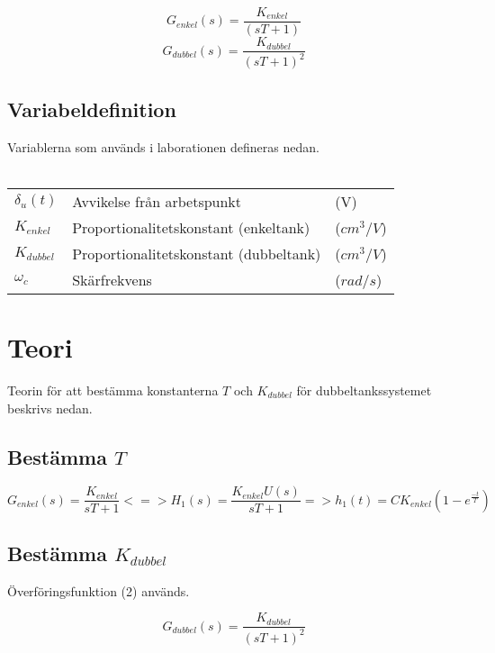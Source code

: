 \documentclass[a4paper]{article}
\begin{document}
\begin{equation}
  G_{enkel}(s)=\frac{K_{enkel}}{(sT+1)}
\end{equation}
\begin{equation}
  G_{dubbel}(s)=\frac{K_{dubbel}}{(sT+1)^2}
\end{equation}

\subsection{Variabeldefinition}

Variablerna som används i laborationen defineras nedan.
\\\\
\begin{tabular}{l l l}
  $\delta_{u}(t)$ & Avvikelse från arbetspunkt & (V) \\
  $K_{enkel}$ & Proportionalitetskonstant (enkeltank) & ($cm^3/V$) \\
  $K_{dubbel}$ & Proportionalitetskonstant (dubbeltank) & ($cm^3/V$) \\
  $\omega_c$ & Skärfrekvens & ($rad/s$)
\end{tabular}

\section{Teori}

Teorin för att bestämma konstanterna $T$ och $K_{dubbel}$ för dubbeltankssystemet beskrivs nedan. 

\subsection{Bestämma $T$}

\begin{equation*}
  G_{enkel}(s)=\frac{K_{enkel}}{sT+1} <=>   
  H_{1}(s)=\frac{K_{enkel}U(s)}{sT+1} =>
  h_{1}(t) = CK_{enkel}(1-e^{\frac{-t}{T}})
\end{equation*}


\subsection{Bestämma $K_{dubbel}$}

Överföringsfunktion (2) används.

\begin{equation}
  G_{dubbel}(s)=\frac{K_{dubbel}}{(sT+1)^2}
\end{equation}
\end{document}
